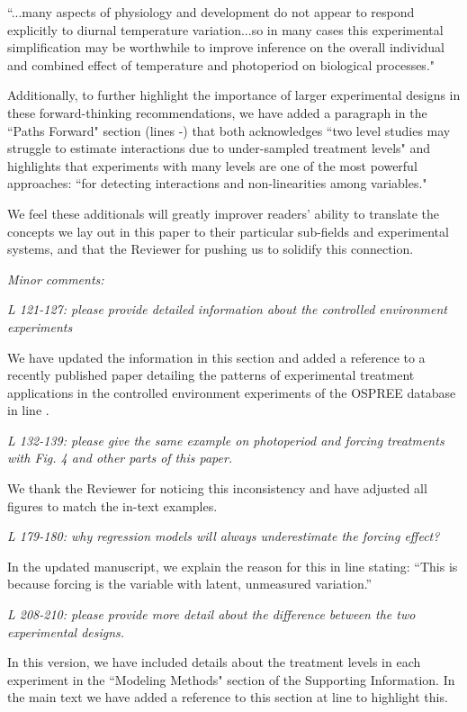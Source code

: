 \documentclass[11pt]{article}
\begin{document}
``...many aspects of physiology and development do not appear to respond explicitly to diurnal temperature variation...so in many cases this experimental simplification may be worthwhile to improve inference on the overall individual and combined effect of temperature and photoperiod on biological processes."

Additionally, to further highlight the importance of larger experimental designs in these forward-thinking recommendations, we have added a paragraph in the ``Paths Forward" section (lines -) that both acknowledges
``two level studies may struggle to estimate interactions due to under-sampled treatment levels" and highlights that experiments with many levels are one of the most powerful approaches: ``for detecting interactions and non-linearities among variables."

We feel these additionals will greatly improver readers' ability to translate the concepts we lay out in this paper to their particular sub-fields and experimental systems, and that the Reviewer for pushing us to solidify this connection.

\emph{Minor comments:}

\emph{L 121-127: please provide detailed information about the controlled environment experiments}

We have updated the information in this section and added a reference to a recently published paper detailing the patterns of experimental treatment applications in the controlled environment experiments of the OSPREE database in line .

\emph{L 132-139: please give the same example on photoperiod and forcing treatments with Fig. 4 and other parts of this paper.}

We thank the Reviewer for noticing this inconsistency and have adjusted all figures to match the in-text examples.

\emph{L 179-180: why regression models will always underestimate the forcing effect?}

In the updated manuscript, we explain the reason for this in line  stating: ``This is because forcing is the variable with latent, unmeasured variation.''

\emph{L 208-210: please provide more detail about the difference between the two experimental designs.}

In this version, we have included details about the treatment levels in each experiment in the ``Modeling Methods" section of the Supporting Information. In the main text we have added a reference to this section at line  to highlight this.
\end{document}

